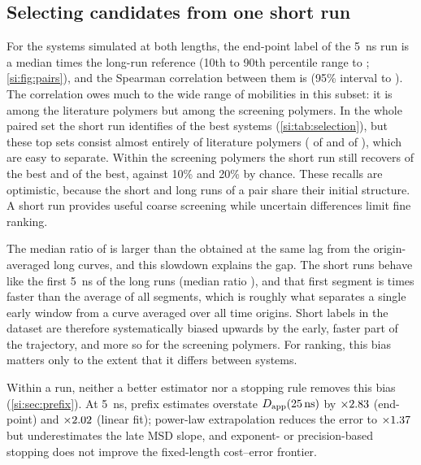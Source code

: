 \documentclass[preprint,12pt]{elsarticle}
\begin{document}
\subsection{Selecting candidates from one short run}\label{sec:res-selection}
For the \nPairs{} systems simulated at both lengths, the end-point label of the
\SI{5}{\nano\second} run is a median \PairEndRatio{} times the long-run reference (10th to 90th percentile range
\PairEndLo{} to \PairEndHi; \cref{si:fig:pairs}), and the Spearman correlation between them is
\PairEndRho{} (95\% interval \PairEndRhoLo{} to \PairEndRhoHi). The correlation owes much to the wide
range of mobilities in this subset: it is \PairEndRhoLit{} among the \nLongLit{} literature
polymers but \PairEndRhoScreen{} among the \nLongScreen{} screening polymers. In the whole
paired set the short run identifies \PairEndTopTenHits{} of the \PairEndTopTenK{} best systems
(\cref{si:tab:selection}), but these top sets consist almost entirely of literature polymers
(\LitInTopTen{} of \PairEndTopTenK{} and \LitInTopTwenty{} of \PairEndTopTwentyK), which are easy to
separate. Within the \ScrN{} screening polymers the short run still recovers \ScrTopTenHits{} of
the \ScrTopTenK{} best and \ScrTopTwentyHits{} of the \ScrTopTwentyK{} best, against 10\% and 20\%
by chance. These recalls are optimistic, because the short and long runs of a pair share their
initial structure. A short run provides useful coarse screening while uncertain differences limit fine ranking.

The median ratio of \PairEndRatio{} is larger than the \ratioFive{} obtained at the same lag from
the origin-averaged long curves, and this slowdown explains the gap. The short runs behave like the
first \SI{5}{\nano\second} of the long runs (median ratio \techoEndShortPrefRatio), and that
first segment is \segEndFirstVsAll{} times faster than the average of all segments, which is
roughly what separates a single early window from a curve averaged over all time origins. Short
labels in the dataset are therefore systematically biased upwards by the early, faster part of
the trajectory, and more so for the screening polymers. For ranking, this bias matters only to the
extent that it differs between systems.

Within a run, neither a better estimator nor a stopping rule removes this bias
(\cref{si:sec:prefix}). At \SI{5}{\nano\second}, prefix estimates overstate $D_{\mathrm{app}}(25\,\mathrm{ns})$
by $\times2.83$ (end-point) and $\times2.02$ (linear fit); power-law
extrapolation reduces the error to $\times1.37$ but underestimates the late MSD slope,
and exponent- or precision-based stopping does not improve the fixed-length cost--error frontier.
\end{document}
